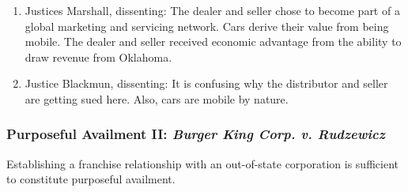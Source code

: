 \begin{enumerate}
{    Shoe} too narrowly. The seller and dealer purposefully injected their 
    product ``into the stream of interstate commerce,'' thus establishing 
    minimum contacts.\footnote{Casebook p. 196.}
    \item Justices Marshall, dissenting: The dealer and seller chose to become 
    part of a global marketing and servicing network. Cars derive their value 
    from being mobile. The dealer and seller received economic advantage from 
    the ability to draw revenue from Oklahoma.
    \item Justice Blackmun, dissenting: It is confusing why the distributor 
    and seller are getting sued here. Also, cars are mobile by nature.
\end{enumerate}

\subsubsection{Purposeful Availment II: \emph{Burger King Corp. v. Rudzewicz}}
Establishing a franchise relationship with an out-of-state corporation is 
sufficient to constitute purposeful availment.

